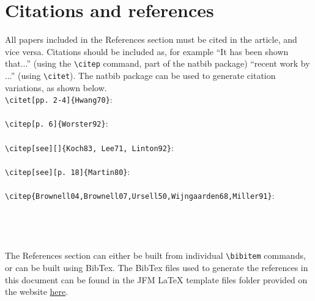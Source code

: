 \documentclass[lineno]{JFM-FLM_Au}
\begin{document}
%
% 
% 



\section{Citations and references}

All papers included in the References section must be cited in the article, and vice versa. Citations should be included as, for example ``It has been shown \citep{Rogallo81} that...'' (using the {\verb}\citep}} command, part of the natbib package) ``recent work by \citet{Dennis85}...'' (using {\verb}\citet}}).
The natbib package can be used to generate citation variations, as shown below.\\
\verb#\citet[pp. 2-4]{Hwang70}#:\\
\citet[pp. 2-4]{Hwang70} \\
\verb#\citep[p. 6]{Worster92}#:\\
\citep[p. 6]{Worster92}\\
\verb#\citep[see][]{Koch83, Lee71, Linton92}#:\\
\citep[see][]{Koch83, Lee71, Linton92}\\
\verb#\citep[see][p. 18]{Martin80}#:\\
\citep[see][p. 18]{Martin80}\\
\verb#\citep{Brownell04,Brownell07,Ursell50,Wijngaarden68,Miller91}#:\\
\citep{Brownell04,Brownell07,Ursell50,Wijngaarden68,Miller91}\\
\citep{Briukhanovetal1967}\\
\cite{Bouguet01}\\
\citep{JosephSaut1990}\\

The References section can either be built from individual \verb#\bibitem# commands, or can be built using BibTex. The BibTex files used to generate the references in this document can be found in the JFM {\LaTeX} template files folder provided on the website \href{https://www.cambridge.org/core/journals/journal-of-fluid-mechanics/information/author-instructions/preparing-your-materials}{here}.
\end{document}
